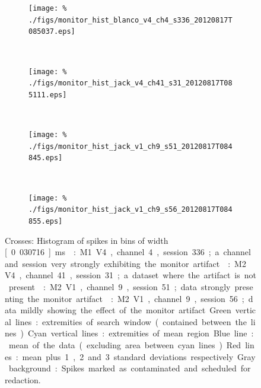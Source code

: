 \begin{figure}[htbp]
    \begin{subfigure}[b]{0.5\linewidth}
        \centering
        \caption{}
        \label{fig:mahist-b4}
        \texttt{[image: \%
./figs/monitor\_hist\_blanco\_v4\_ch4\_s336\_20120817T085037.eps]}
    \end{subfigure}
    ~~
    \begin{subfigure}[b]{0.5\linewidth}
        \centering
        \caption{}
        \label{fig:mahist-j4}
        \texttt{[image: \%
./figs/monitor\_hist\_jack\_v4\_ch41\_s31\_20120817T085111.eps]}
    \end{subfigure}
    \\
    \begin{subfigure}[b]{0.5\linewidth}
        \centering
        \caption{}
        \label{fig:mahist-j1s51}
        \texttt{[image: \%
./figs/monitor\_hist\_jack\_v1\_ch9\_s51\_20120817T084845.eps]}
    \end{subfigure}
    ~~
    \begin{subfigure}[b]{0.5\linewidth}
        \centering
        \caption{}
        \label{fig:mahist-j1s56}
        \texttt{[image: \%
./figs/monitor\_hist\_jack\_v1\_ch9\_s56\_20120817T084855.eps]}
    \end{subfigure}
    \caption{Crosses: Histogram of spikes in bins of width \unit[0.030716]{ms}.
: M1 V4, channel 4, session 336; a channel and session very strongly exhibiting the monitor artifact.
: M2 V4, channel 41, session 31; a dataset where the artifact is not present.
: M2 V1, channel 9, session 51; data strongly presenting the monitor artifact.
: M2 V1, channel 9, session 56; data mildly showing the effect of the monitor artifact.
Green vertical lines: extremities of search window (contained between the lines).
Cyan vertical lines: extremities of mean region.
Blue line: mean of the data (excluding area between cyan lines).
Red lines: mean plus 1, 2 and 3 standard deviations respectively.
Gray background: Spikes marked as contaminated and scheduled for redaction.
}
    \label{fig:mahist}
\end{figure}


